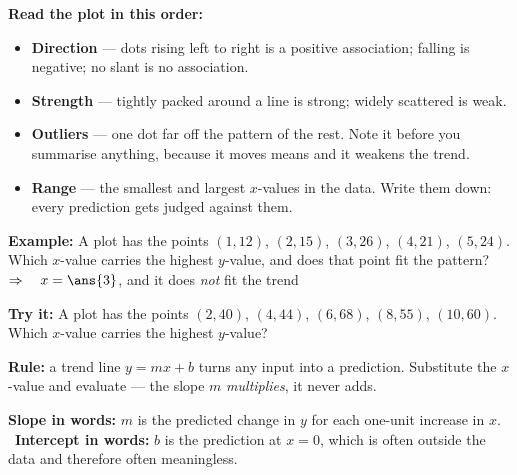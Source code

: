 \documentclass[12pt]{article}
\begin{document}


\begin{formulabox}
\textbf{Read the plot in this order:}
\begin{itemize}[label={$\bullet$}, leftmargin=1.1cm, itemsep=1pt, topsep=2pt]
  \item \textbf{Direction} --- dots rising left to right is a positive association;
        falling is negative; no slant is no association.
  \item \textbf{Strength} --- tightly packed around a line is strong; widely scattered is
        weak.
  \item \textbf{Outliers} --- one dot far off the pattern of the rest. Note it before you
        summarise anything, because it moves means and it weakens the trend.
  \item \textbf{Range} --- the smallest and largest $x$-values in the data. Write them
        down: every prediction gets judged against them.
\end{itemize}
\end{formulabox}

\begin{examplebox}
\textbf{Example:} \quad A plot has the points $(1, 12)$, $(2, 15)$, $(3, 26)$, $(4, 21)$,
$(5, 24)$. Which $x$-value carries the highest $y$-value, and does that point fit the
pattern?
$\Rightarrow\quad x = \ans{3}$, and it does \emph{not} fit the trend
\end{examplebox}

\begin{tryitbox}
\textbf{Try it:} \quad A plot has the points $(2, 40)$, $(4, 44)$, $(6, 68)$, $(8, 55)$,
$(10, 60)$. Which $x$-value carries the highest $y$-value?\\[2pt]
\end{tryitbox}


\begin{formulabox}
\textbf{Rule:} a trend line $y = mx + b$ turns any input into a prediction. Substitute the
$x$-value and evaluate --- the slope $m$ \emph{multiplies}, it never adds.\par
\smallskip
\textbf{Slope in words:} $m$ is the predicted change in $y$ for each one-unit increase in
$x$. \ \textbf{Intercept in words:} $b$ is the prediction at $x = 0$, which is often
outside the data and therefore often meaningless.
\end{formulabox}
\end{document}
